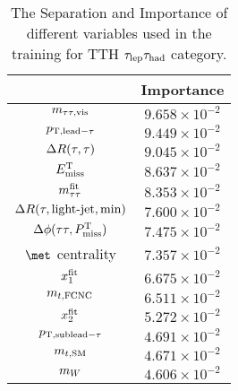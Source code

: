 \begin{table}
\caption{The Separation and Importance of different variables used in the training for TTH $\tau_\text{lep}{}\tau_\text{had}$ category.}
\centering
\begin{tabular}{|c|c|} \hline
 & Importance \\ \hline
$m_{\tau\tau,\text{vis}}     $ & $9.658\times10^{-2}$ \\
$p_{\text{T},\text{lead}-\tau}        $ & $9.449\times10^{-2}$ \\
$\Delta R(\tau,\tau)      $ & $9.045\times10^{-2}$ \\
$E^{\text{T}}_{\text{miss}}        $ & $8.637\times10^{-2}$ \\
$m_{\tau\tau}^{\text{fit}}    $ & $8.353\times10^{-2}$ \\
$\Delta R(\tau,\text{light-jet},\text{min})     $ & $7.600\times10^{-2}$ \\
$\Delta\phi(\tau\tau,P^{\text{T}}_{\text{miss}}) $ & $7.475\times10^{-2}$ \\
$\met$ centrality & $7.357\times10^{-2}$ \\
$x_1^{\text{fit}}         $ & $6.675\times10^{-2}$ \\
$m_{t,\text{FCNC}}        $ & $6.511\times10^{-2}$ \\
$x_2^{\text{fit}}         $ & $5.272\times10^{-2}$ \\
$p_{\text{T},\text{sublead}-\tau}        $ & $4.691\times10^{-2}$ \\
$m_{t,\text{SM}}        $ & $4.671\times10^{-2}$ \\
$m_W         $ & $4.606\times10^{-2}$ \\\hline

\end{tabular}
\label{tab:mva_sep_imp_lh_4j}
\end{table}

